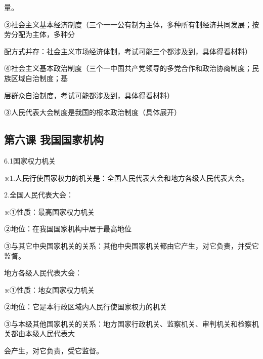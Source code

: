 \documentclass[lang=cn,11pt]{elegantbook}
\newcommand{\daofasym}[1]{{\daofasymbolfont #1}}
\newcommand{\daofasym}[1]{#1}
\begin{document}
量。\par

\daofasym{③}社会主义基本经济制度（三个一一公有制为主体，多种所有制经济共同发展；按劳分配为主体，多种分\par

配方式并存：社会主义市场经济体制，考试可能三个都涉及到，具体得看材料）\par

\daofasym{④}社会主义基本政治制度（三个一中国共产党领导的多党合作和政治协商制度；民族区域自治制度；基\par

层群众自治制度，考试可能都涉及到，具体得看材料）\par

\daofasym{③}人民代表大会制度是我国的根本政治制度（具体展开）\par

\subsection*{第六课 我国国家机构}

6.1国家权力机关\par

※1.人民行使国家权力的机关是：全国人民代表大会和地方各级人民代表大会。\par

2.全国人民代表大会：\par

※\daofasym{①}性质：最高国家权力机关\par

\daofasym{②}地位：在我国国家机构中居于最高地位\par

\daofasym{③}与其它中央国家机关的关系：其他中央国家机关都由它产生，对它负责，并受它监督。\par

地方各级人民代表大会：\par

※\daofasym{①}性质：地女国家权力机关\par

\daofasym{②}地位：它是本行政区域内人民行使国家权力的机关\par

\daofasym{③}与本级其他国家机关的关系：地方国家行政机关、监察机关、审判机关和检察机关都由本级人民代表大\par

会产生，对它负责，受它监督。\par
\end{document}
